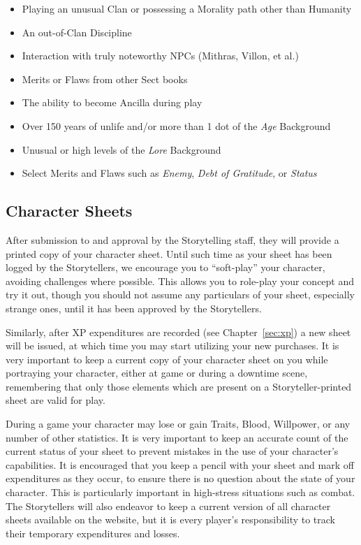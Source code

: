 \begin{itemize}
	\item Playing an unusual Clan or possessing a Morality path other than Humanity
	\item An out-of-Clan Discipline
	\item Interaction with truly noteworthy NPCs (Mithras, Villon, et al.)
	\item Merits or Flaws from other Sect books
	\item The ability to become Ancilla during play
	\item Over 150 years of unlife and/or more than 1 dot of the \emph{Age} Background
	\item Unusual or high levels of the \emph{Lore} Background
	\item Select Merits and Flaws such as \emph{Enemy}, \emph{Debt of Gratitude}, or \emph{Status}
\end{itemize}

\subsection{Character Sheets}
After submission to and approval by the Storytelling staff, they will provide a printed copy of your 
character sheet.  Until such time as your sheet has been logged by the Storytellers, we encourage you 
to ``soft-play'' your character, avoiding challenges where possible.  This allows you to role-play your 
concept and try it out, though you should not assume any particulars of your sheet, especially strange 
ones, until it has been approved by the Storytellers.

Similarly, after XP expenditures are recorded (see Chapter~\ref{sec:xp}) a new sheet will be issued, 
at which time you may start utilizing your new purchases.  It is very important to keep a current copy 
of your character sheet on you while portraying your character, either at game or during a downtime scene, 
remembering that only those elements which are present on a Storyteller-printed sheet are valid for play.

During a game your character may lose or gain Traits, Blood, Willpower, or any number of other statistics.  
It is very important to keep an accurate count of the current status of your sheet to prevent mistakes 
in the use of your character's capabilities.  It is encouraged that you keep a pencil with your sheet and 
mark off expenditures as they occur, to ensure there is no question about the state of your character.  
This is particularly important in high-stress situations such as combat.  The Storytellers will also 
endeavor to keep a current version of all character sheets available on the website, but it is every 
player's responsibility to track their temporary expenditures and losses.

